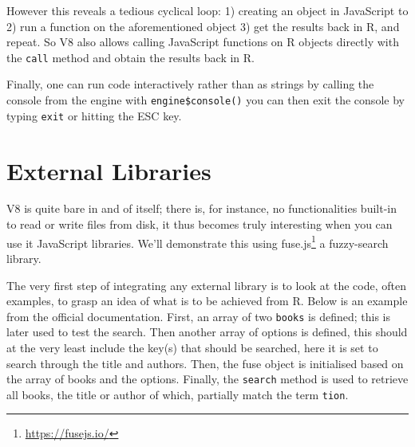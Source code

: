 \documentclass[
]{krantz}
\makeatletter
\newenvironment{Shaded}{\begin{snugshade}}{\end{snugshade}}
\newcommand{\CommentTok}[1]{\textcolor[rgb]{0.37,0.37,0.37}{\textit{#1}}}
\newcommand{\KeywordTok}[1]{\textcolor[rgb]{0.27,0.27,0.27}{\textbf{#1}}}
\newcommand{\NormalTok}[1]{#1}
\newcommand{\OperatorTok}[1]{\textcolor[rgb]{0.43,0.43,0.43}{\textbf{#1}}}
\newcommand{\StringTok}[1]{\textcolor[rgb]{0.5,0.5,0.5}{#1}}
\renewcommand{\href}[2]{#2\footnote{\url{#1}}}
\newenvironment{kframe}{%
\medskip{}
\setlength{\fboxsep}{.8em}
 \def\at@end@of@kframe{}%
 \ifinner\ifhmode%
  \def\at@end@of@kframe{\end{minipage}}%
  \begin{minipage}{\columnwidth}%
 \fi\fi%
 \def\FrameCommand##1{\hskip\@totalleftmargin \hskip-\fboxsep
 \colorbox{shadecolor}{##1}\hskip-\fboxsep
     \hskip-\linewidth \hskip-\@totalleftmargin \hskip\columnwidth}%
 \MakeFramed {\advance\hsize-\width
   \@totalleftmargin\z@ \linewidth\hsize
   \@setminipage}}%
 {\par\unskip\endMakeFramed%
 \at@end@of@kframe}
\renewenvironment{Shaded}{\begin{kframe}}{\end{kframe}}
\makeatother
\begin{document}
However this reveals a tedious cyclical loop: 1) creating an object in JavaScript to 2) run a function on the aforementioned object 3) get the results back in R, and repeat. So V8 also allows calling JavaScript functions on R objects directly with the \texttt{call} method and obtain the results back in R.

\begin{Shaded}
\end{Shaded}

Finally, one can run code interactively rather than as strings by calling the console from the engine with \texttt{engine\$console()} you can then exit the console by typing \texttt{exit} or hitting the ESC key.

\hypertarget{v8-external}{%
\section{External Libraries}\label{v8-external}}

V8 is quite bare in and of itself; there is, for instance, no functionalities built-in to read or write files from disk, it thus becomes truly interesting when you can use it JavaScript libraries. We'll demonstrate this using \href{https://fusejs.io/}{fuse.js} a fuzzy-search library.

The very first step of integrating any external library is to look at the code, often examples, to grasp an idea of what is to be achieved from R. Below is an example from the official documentation. First, an array of two \texttt{books} is defined; this is later used to test the search. Then another array of options is defined, this should at the very least include the key(s) that should be searched, here it is set to search through the title and authors. Then, the fuse object is initialised based on the array of books and the options. Finally, the \texttt{search} method is used to retrieve all books, the title or author of which, partially match the term \texttt{tion}.
\end{document}
